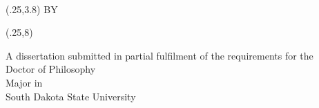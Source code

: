 \documentclass[SDSUThesis.tex]{subfiles}
\begin{document}
\begin{titlepage}
\center

\yourtitle\\

\begin{textblock}{8.5}(.25,3.8)
    \centering
    BY\\[1ex]
    \yourname  
\end{textblock}

\begin{textblock}{8.5}(.25,8)
    \centering
    
    A dissertation submitted in partial fulfilment of the requirements for the\\[.9ex]
    Doctor of Philosophy\\[.9ex]
    Major in \yourmajor\\ [.9ex]
    South Dakota State University\\ [.9ex]
    \number\year
\end{textblock}

\end{titlepage}
\end{document}
